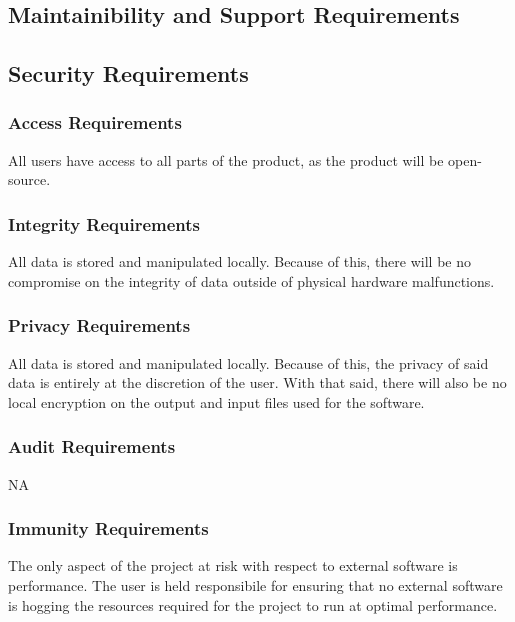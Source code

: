 \documentclass[12pt]{article}
\begin{document}
\subsection{Maintainibility and Support Requirements} %

\subsection{Security Requirements} %
\subsubsection{Access Requirements}
All users have access to all parts of the product, as the product will be open-source.

\subsubsection{Integrity Requirements}
All data is stored and manipulated locally. Because of this, there will be no compromise on the integrity of data outside of physical hardware malfunctions.

\subsubsection{Privacy Requirements}
All data is stored and manipulated locally. Because of this, the privacy of said data is entirely at the discretion of the user. With that said, there will also be no local encryption on the output and input files used for the software.

\subsubsection{Audit Requirements}
NA

\subsubsection{Immunity Requirements}
The only aspect of the project at risk with respect to external software is performance. The user is held responsibile for ensuring that no external software is hogging the resources required for the project to run at optimal performance.

\end{document}
